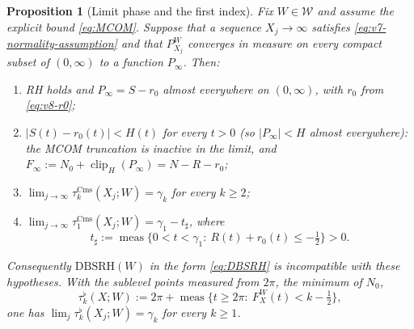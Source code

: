 \documentclass[11pt,a4paper]{article}
\numberwithin{equation}{section}
\newtheorem{proposition}[theorem]{Proposition}
\theoremstyle{definition}
\theoremstyle{remark}
\newcommand{\meas}{\operatorname{meas}}
\newcommand{\clip}{\operatorname{clip}}
\newcommand{\Cms}{\mathrm{Cms}}
\begin{document}
\begin{proposition}[Limit phase and the first index]\label{prop:v8-first}
Fix $W\in\mathcal W$ and assume the explicit bound \eqref{eq:MCOM}. Suppose that a sequence $X_j\to\infty$
satisfies \eqref{eq:v7-normality-assumption} and that
$P_{X_j}^W$ converges in measure on every compact subset of
$(0,\infty)$ to a function $P_\infty$. Then:
\begin{enumerate}[label=(\alph*),leftmargin=*]
\item RH holds and $P_\infty=S-r_0$ almost everywhere on $(0,\infty)$,
 with $r_0$ from \eqref{eq:v8-r0};
\item $|S(t)-r_0(t)|<H(t)$ for every $t>0$ (so $|P_\infty|<H$ almost everywhere): the MCOM truncation is
 inactive in the limit, and $F_\infty:=N_0+\clip_H(P_\infty)=N-R-r_0$;
\item $\lim_{j\to\infty}\tau_k^{\Cms}(X_j;W)=\gamma_k$ for every $k\ge2$;
\item $\lim_{j\to\infty}\tau_1^{\Cms}(X_j;W)=\gamma_1-t_\sharp$, where
\begin{equation}\label{eq:v8-tsharp}
 t_\sharp:=\meas\{0<t<\gamma_1:\ R(t)+r_0(t)\le-\tfrac12\}>0 .
\end{equation}
\end{enumerate}
Consequently $\mathrm{DBSRH}(W)$ in the form \eqref{eq:DBSRH} is
incompatible with these hypotheses. With the sublevel points
measured from $2\pi$, the minimum of $N_0$,
\begin{equation}\label{eq:v8-flat}
 \tau_k^\flat(X;W):=2\pi+\meas\{t\ge2\pi:\ F_X^W(t)<k-\tfrac12\},
\end{equation}
one has $\lim_j\tau_k^\flat(X_j;W)=\gamma_k$ for every $k\ge1$.
\end{proposition}
\end{document}
